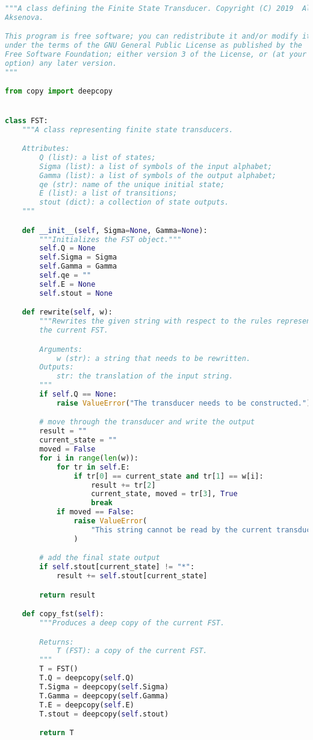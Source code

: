 \begin{lstlisting}[language=Python]
"""A class defining the Finite State Transducer. Copyright (C) 2019  Alena
Aksenova.

This program is free software; you can redistribute it and/or modify it
under the terms of the GNU General Public License as published by the
Free Software Foundation; either version 3 of the License, or (at your
option) any later version.
"""

from copy import deepcopy


class FST:
    """A class representing finite state transducers.

    Attributes:
        Q (list): a list of states;
        Sigma (list): a list of symbols of the input alphabet;
        Gamma (list): a list of symbols of the output alphabet;
        qe (str): name of the unique initial state;
        E (list): a list of transitions;
        stout (dict): a collection of state outputs.
    """

    def __init__(self, Sigma=None, Gamma=None):
        """Initializes the FST object."""
        self.Q = None
        self.Sigma = Sigma
        self.Gamma = Gamma
        self.qe = ""
        self.E = None
        self.stout = None

    def rewrite(self, w):
        """Rewrites the given string with respect to the rules represented in
        the current FST.

        Arguments:
            w (str): a string that needs to be rewritten.
        Outputs:
            str: the translation of the input string.
        """
        if self.Q == None:
            raise ValueError("The transducer needs to be constructed.")

        # move through the transducer and write the output
        result = ""
        current_state = ""
        moved = False
        for i in range(len(w)):
            for tr in self.E:
                if tr[0] == current_state and tr[1] == w[i]:
                    result += tr[2]
                    current_state, moved = tr[3], True
                    break
            if moved == False:
                raise ValueError(
                    "This string cannot be read by the current transducer."
                )

        # add the final state output
        if self.stout[current_state] != "*":
            result += self.stout[current_state]

        return result

    def copy_fst(self):
        """Produces a deep copy of the current FST.

        Returns:
            T (FST): a copy of the current FST.
        """
        T = FST()
        T.Q = deepcopy(self.Q)
        T.Sigma = deepcopy(self.Sigma)
        T.Gamma = deepcopy(self.Gamma)
        T.E = deepcopy(self.E)
        T.stout = deepcopy(self.stout)

        return T
\end{lstlisting}

